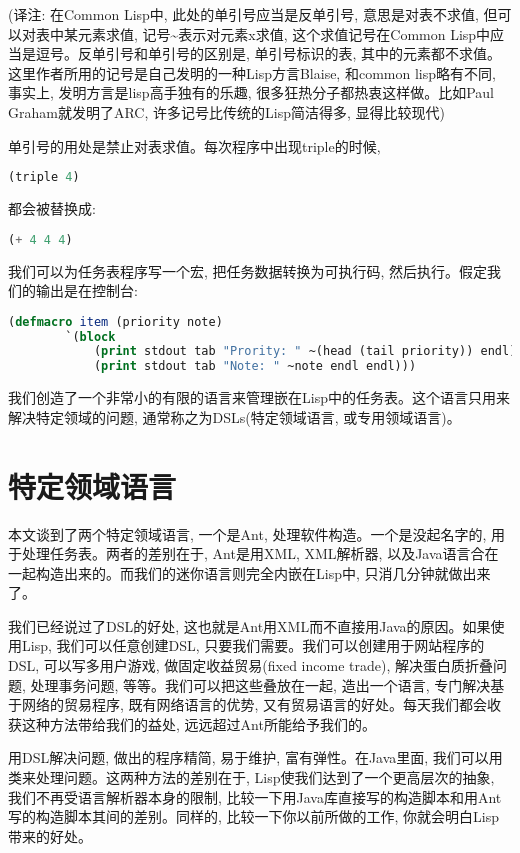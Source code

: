 \documentclass[10pt]{article}
\begin{document}
(译注: 在Common Lisp中, 此处的单引号应当是反单引号, 意思是对表不求值, 但可以对表中某元素求值, 记号\textasciitilde{}表示对元素x求值, 这个求值记号在Common Lisp中应当是逗号。反单引号和单引号的区别是, 单引号标识的表, 其中的元素都不求值。这里作者所用的记号是自己发明的一种Lisp方言Blaise, 和common lisp略有不同, 事实上, 发明方言是lisp高手独有的乐趣, 很多狂热分子都热衷这样做。比如Paul Graham就发明了ARC, 许多记号比传统的Lisp简洁得多, 显得比较现代)

单引号的用处是禁止对表求值。每次程序中出现triple的时候, 
\begin{lstlisting}[language=lisp]
    (triple 4)
\end{lstlisting}

都会被替换成:
\begin{lstlisting}[language=lisp]
    (+ 4 4 4)
\end{lstlisting}

我们可以为任务表程序写一个宏, 把任务数据转换为可执行码, 然后执行。假定我们的输出是在控制台:
\begin{lstlisting}[language=lisp]
    (defmacro item (priority note)
        `(block 
            (print stdout tab "Prority: " ~(head (tail priority)) endl)
            (print stdout tab "Note: " ~note endl endl)))
\end{lstlisting}

我们创造了一个非常小的有限的语言来管理嵌在Lisp中的任务表。这个语言只用来解决特定领域的问题, 通常称之为DSLs(特定领域语言, 或专用领域语言)。
\section{特定领域语言}
\label{sec-9}

本文谈到了两个特定领域语言, 一个是Ant, 处理软件构造。一个是没起名字的, 用于处理任务表。两者的差别在于, Ant是用XML, XML解析器, 以及Java语言合在一起构造出来的。而我们的迷你语言则完全内嵌在Lisp中, 只消几分钟就做出来了。

我们已经说过了DSL的好处, 这也就是Ant用XML而不直接用Java的原因。如果使用Lisp, 我们可以任意创建DSL, 只要我们需要。我们可以创建用于网站程序的DSL, 可以写多用户游戏, 做固定收益贸易(fixed income trade), 解决蛋白质折叠问题, 处理事务问题, 等等。我们可以把这些叠放在一起, 造出一个语言, 专门解决基于网络的贸易程序, 既有网络语言的优势, 又有贸易语言的好处。每天我们都会收获这种方法带给我们的益处, 远远超过Ant所能给予我们的。

用DSL解决问题, 做出的程序精简, 易于维护, 富有弹性。在Java里面, 我们可以用类来处理问题。这两种方法的差别在于, Lisp使我们达到了一个更高层次的抽象, 我们不再受语言解析器本身的限制, 比较一下用Java库直接写的构造脚本和用Ant写的构造脚本其间的差别。同样的, 比较一下你以前所做的工作, 你就会明白Lisp带来的好处。
\end{document}
